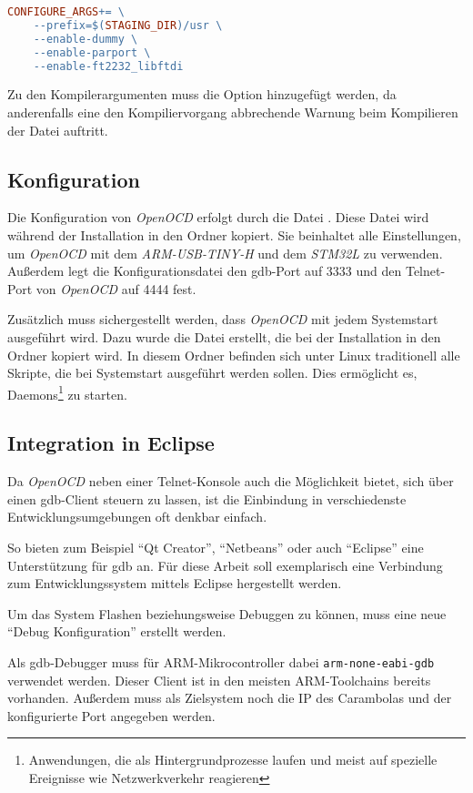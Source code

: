\begin{lstlisting}[language=make]
CONFIGURE_ARGS+= \
	--prefix=$(STAGING_DIR)/usr \
	--enable-dummy \
	--enable-parport \
	--enable-ft2232_libftdi
\end{lstlisting}

Zu den Kompilerargumenten muss die Option
 hinzugefügt werden, da anderenfalls
eine den Kompiliervorgang abbrechende Warnung beim Kompilieren der Datei
 auftritt.
\subsection{Konfiguration}
Die Konfiguration von \emph{OpenOCD} erfolgt durch die Datei .
Diese Datei wird während der Installation in den Ordner
\listinlsh{/etc/} kopiert. Sie beinhaltet alle Einstellungen, um \emph{OpenOCD}
mit dem \emph{ARM-USB-TINY-H} und dem \emph{STM32L} zu verwenden. Außerdem legt die
Konfigurationsdatei den \gls{gdb}-Port auf 3333 und den Telnet-Port von \emph{OpenOCD}
auf 4444 fest.

Zusätzlich muss sichergestellt werden, dass \emph{OpenOCD} mit jedem Systemstart
ausgeführt wird. Dazu wurde die Datei \listinlsh{openocd.init} erstellt, die
bei der Installation in den Ordner  kopiert wird.
In diesem Ordner befinden sich unter Linux traditionell alle Skripte, die bei
Systemstart ausgeführt werden sollen. Dies ermöglicht es,
Daemons\footnote{Anwendungen, die als Hintergrundprozesse laufen und meist auf
spezielle Ereignisse wie Netzwerkverkehr reagieren} zu starten.
\subsection{Integration in Eclipse}\label{subs:eclipse}
Da \emph{OpenOCD} neben einer Telnet-Konsole auch die Möglichkeit bietet, sich über
einen \gls{gdb}-Client steuern zu lassen, ist die Einbindung in verschiedenste
Entwicklungsumgebungen oft denkbar einfach.

So bieten zum Beispiel "`Qt Creator"', "`Netbeans"' oder auch "`Eclipse"' eine
Unterstützung für \gls{gdb} an. Für diese Arbeit soll exemplarisch eine
Verbindung zum Entwicklungssystem mittels Eclipse hergestellt werden.

Um das System Flashen beziehungsweise Debuggen zu können, muss eine neue "`Debug
Konfiguration"' erstellt werden.

Als \gls{gdb}-Debugger muss für ARM-Mikrocontroller dabei
\texttt{arm-none-eabi-gdb} verwendet werden. Dieser Client ist in den meisten
ARM-Toolchains bereits vorhanden. Außerdem muss als Zielsystem noch die IP des
Carambolas und der konfigurierte Port angegeben werden.

